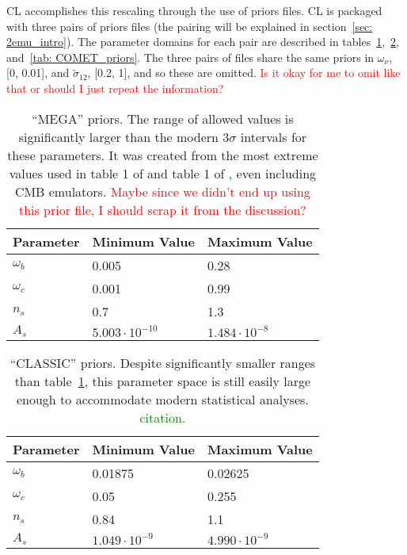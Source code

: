 CL accomplishes this rescaling through the use of priors files.
CL is packaged with three pairs of priors files (the pairing will be explained
in section~\ref{sec: 2emu_intro}). The parameter domains for each pair are
described in tables~\ref{tab: MEGA_priors},~\ref{tab: CLASSIC_priors},
and~\ref{tab: COMET_priors}. The three pairs of files share the same priors in
$\omega_\nu$, [0, 0.01], and $\tilde{\sigma}_{12}$, [0.2, 1], and so these are
omitted. \textcolor{red}{Is it okay for me to omit like that or should I just
repeat the information?}

\begin{table}[ht!]
\centering
\begin{tabular}{l|l|l}
\hline
Parameter & Minimum Value & Maximum Value \\ \hline
$\omega_b$ & 0.005 & 0.28 \\
$\omega_c$ & 0.001 & 0.99 \\
$n_s$ & 0.7 & 1.3 \\
$A_s$\footnotemark & $5.003 \cdot 10^{-10}$ & $1.484 \cdot 10^{-8}$  \\
\end{tabular}
 \cprotect\caption[``MEGA'' priors]{``MEGA'' priors. The range of allowed
 	values is significantly larger than the modern $3\sigma$ intervals
 	for these parameters. It was created from the most extreme values used
 	in table 1 of \citet{Mancini} and table 1 of \citet{Arico}, even including
 	CMB emulators. 
 	\textcolor{red}{Maybe since we didn't end up using this prior file, I
 	should scrap it from the discussion?}}
 \label{tab: MEGA_priors}
\end{table}

\begin{table}[ht!]
\centering
\begin{tabular}{l|l|l}
\hline
Parameter & Minimum Value & Maximum Value \\ \hline
$\omega_b$ & 0.01875 & 0.02625 \\
$\omega_c$ & 0.05 & 0.255 \\
$n_s$ & 0.84 & 1.1 \\
$A_s$\footnotemark & $1.049 \cdot 10^{-9}$ & $4.990 \cdot 10^{-9}$  \\
\end{tabular}
	\cprotect\caption[``CLASSIC'' priors]{``CLASSIC'' priors. Despite
 	significantly smaller ranges than table~\ref{tab: MEGA_priors}, this
 	parameter space is still easily large enough to accommodate modern
 	statistical analyses. \textcolor{green}{citation.}}
 \label{tab: CLASSIC_priors}
\end{table}

